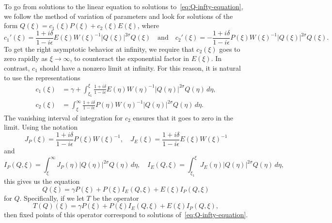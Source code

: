 \documentclass[11pt]{article}
\begin{document}
To go from solutions to the linear equation to solutions
to~\eqref{eq:Q-infty-equation}, we follow the method of variation of
parameters and look for solutions of the form
\(Q(\xi) = c_{1}(\xi)P(\xi) + c_{2}(\xi)E(\xi)\), where
\begin{equation*}
  c_{1}'(\xi) = \frac{1 + i\delta}{1 - i \epsilon}E(\xi)W(\xi)^{-1}|Q(\xi)|^{2\sigma}Q(\xi)
  \quad\text{and}\quad
  c_{2}'(\xi) = -\frac{1 + i\delta}{1 - i \epsilon}P(\xi)W(\xi)^{-1}|Q(\xi)|^{2\sigma}Q(\xi).
\end{equation*}
To get the right asymptotic behavior at infinity, we require that
\(c_{2}(\xi)\) goes to zero rapidly as \(\xi \to \infty\), to
counteract the exponential factor in \(E(\xi)\). In contrast,
\(c_{1}\) should have a nonzero limit at infinity. For this reason, it
is natural to use the representations
\begin{align*}
  c_{1}(\xi) &= \gamma + \int_{\xi_{1}}^{\xi}\frac{1 + i\delta}{1 - i \epsilon}E(\eta)W(\eta)^{-1}|Q(\eta)|^{2\sigma}Q(\eta)\,d\eta,\\
  c_{2}(\xi) &= \int_{\xi}^{\infty}\frac{1 + i\delta}{1 - i \epsilon}P(\eta)W(\eta)^{-1}|Q(\eta)|^{2\sigma}Q(\eta)\,d\eta.
\end{align*}
The vanishing interval of integration for \(c_{2}\) ensures that it
goes to zero in the limit. Using the notation
\begin{equation*}
  J_{P}(\xi) = \frac{1 + i\delta}{1 - i \epsilon}P(\xi)W(\xi)^{-1},\quad
  J_{E}(\xi) = \frac{1 + i\delta}{1 - i \epsilon}E(\xi)W(\xi)^{-1}
\end{equation*}
and
\begin{equation*}
  I_{P}(Q, \xi) = \int_{\xi}^{\infty} J_{P}(\eta)|Q(\eta)|^{2\sigma}Q(\eta)\,d\eta,\quad
  I_{E}(Q, \xi) = \int_{\xi_{1}}^{\xi} J_{E}(\eta)|Q(\eta)|^{2\sigma}Q(\eta)\,d\eta,
\end{equation*}
this gives us the equation
\begin{equation}\label{eq:Q-infty-fixed-point-equation}
  Q(\xi) = \gamma P(\xi) + P(\xi)I_{E}(Q, \xi) + E(\xi)I_{P}(Q, \xi)
\end{equation}
for \(Q\). Specifically, if we let \(T\) be the operator
\begin{equation}\label{eq:T}
  T(Q)(\xi) = \gamma P(\xi) + P(\xi)I_{E}(Q, \xi) + E(\xi)I_{P}(Q, \xi),
\end{equation}
then fixed points of this operator correspond to solutions
of~\eqref{eq:Q-infty-equation}.
\end{document}
